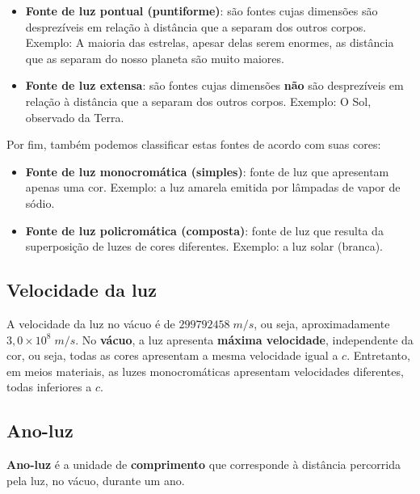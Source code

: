 \documentclass[11pt,twocolumn,oneside]{article}
\begin{document}
\begin{itemize}

\item \textbf{Fonte de luz pontual (puntiforme)}: são fontes cujas dimensões são desprezíveis em relação à distância que a separam dos outros corpos. Exemplo: A maioria das estrelas, apesar delas serem enormes, as distância que as separam do nosso planeta são muito maiores.

\item \textbf{Fonte de luz extensa}: são fontes cujas dimensões \textbf{não} são desprezíveis em relação à distância que a separam dos outros corpos. Exemplo: O Sol, observado da Terra.

\end{itemize}


Por fim, também podemos classificar estas fontes de acordo com suas cores:


\begin{itemize}

\item \textbf{Fonte de luz monocromática (simples)}: fonte de luz que apresentam apenas uma cor. Exemplo: a luz amarela emitida por lâmpadas de vapor de sódio.

\item \textbf{Fonte de luz policromática (composta)}: fonte de luz que resulta da superposição de luzes de cores diferentes. Exemplo: a luz solar (branca).

\end{itemize}


\hypertarget{x-velocidade-da-luz}{\subsection{Velocidade da luz}}
A velocidade da luz no vácuo é de $299792458\;m/s$, ou seja, aproximadamente $3,0\times 10^{8}\;m/s$. No \textbf{vácuo}, a luz apresenta \textbf{máxima velocidade}, independente da cor, ou seja, todas as cores apresentam a mesma velocidade igual a $c$. Entretanto, em meios materiais, as luzes monocromáticas apresentam velocidades diferentes, todas inferiores a $c$.


\hypertarget{x-ano-luz}{\subsection{Ano-luz}}
\textbf{Ano-luz} é a unidade de \textbf{comprimento} que corresponde à distância percorrida pela luz, no vácuo, durante um ano.
\end{document}
